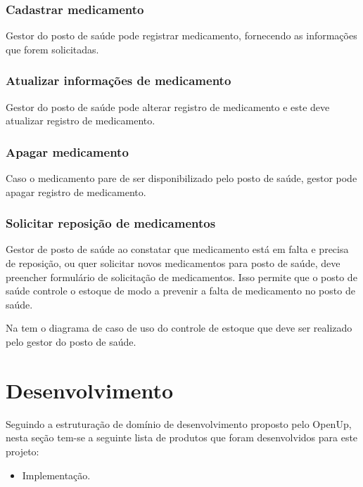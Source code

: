 \subsubsection{Cadastrar medicamento}

Gestor do posto de saúde pode registrar medicamento, fornecendo as informações que forem solicitadas.

\subsubsection{Atualizar informações de medicamento}

Gestor do posto de saúde pode alterar registro de medicamento e este deve atualizar registro de medicamento. 

\subsubsection{Apagar medicamento}

Caso o medicamento pare de ser disponibilizado pelo posto de saúde, gestor pode apagar registro de medicamento.

\subsubsection{Solicitar reposição de medicamentos}
Gestor de posto de saúde ao constatar que medicamento está em falta e precisa de reposição, ou quer solicitar novos medicamentos para posto de saúde, deve preencher formulário de solicitação de medicamentos. Isso permite que o posto de saúde controle o estoque de modo a prevenir a falta de medicamento no posto de saúde.

Na  tem o diagrama de caso de uso do controle de estoque que deve ser realizado pelo gestor do posto de saúde.

%



\section{Desenvolvimento}

Seguindo a estruturação de domínio de desenvolvimento proposto pelo \acrfull{OpenUp}, nesta seção tem-se a seguinte lista de produtos que foram desenvolvidos para este projeto:

\begin{itemize}
    \item Implementação.
  \end{itemize}

